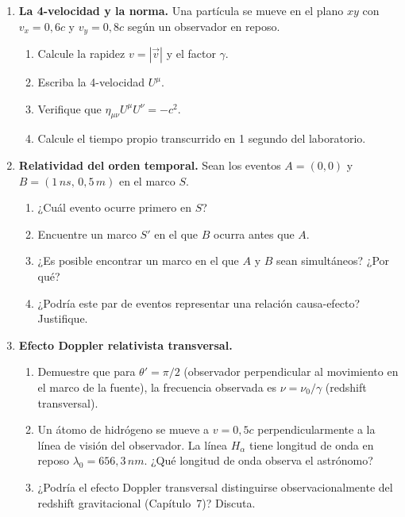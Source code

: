 \begin{enumerate}[leftmargin=2em, label=\textbf{P\thechapter.\arabic*.}]
  \item \textbf{La 4-velocidad y la norma.}
  Una partícula se mueve en el plano $xy$ con $v_x = 0{,}6c$ y $v_y = 0{,}8c$ según un observador en reposo.
  \begin{enumerate}[label=(\alph*)]
    \item Calcule la rapidez $v = |\vec{v}|$ y el factor $\gamma$.
    \item Escriba la 4-velocidad $U^\mu$.
    \item Verifique que $\eta_{\mu\nu}U^\mu U^\nu = -c^2$.
    \item Calcule el tiempo propio transcurrido en 1 segundo del laboratorio.
  \end{enumerate}

  \item \textbf{Relatividad del orden temporal.}
  Sean los eventos $A = (0, 0)$ y $B = (1\,\si{ns},\, 0{,}5\,\si{m})$ en el marco $S$.
  \begin{enumerate}[label=(\alph*)]
    \item ¿Cuál evento ocurre primero en $S$?
    \item Encuentre un marco $S'$ en el que $B$ ocurra antes que $A$.
    \item ¿Es posible encontrar un marco en el que $A$ y $B$ sean simultáneos? ¿Por qué?
    \item ¿Podría este par de eventos representar una relación causa-efecto? Justifique.
  \end{enumerate}

  \item \textbf{Efecto Doppler relativista transversal.}
  \begin{enumerate}[label=(\alph*)]
    \item Demuestre que para $\theta' = \pi/2$ (observador perpendicular al movimiento en el marco de la fuente), la frecuencia observada es $\nu = \nu_0/\gamma$ (redshift transversal).
    \item Un átomo de hidrógeno se mueve a $v = 0{,}5c$ perpendicularmente a la línea de visión del observador. La línea $H_\alpha$ tiene longitud de onda en reposo $\lambda_0 = 656{,}3\,\si{nm}$. ¿Qué longitud de onda observa el astrónomo?
    \item ¿Podría el efecto Doppler transversal distinguirse observacionalmente del redshift gravitacional (Capítulo~7)? Discuta.
  \end{enumerate}


\end{enumerate}
